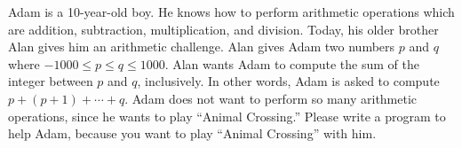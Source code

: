 Adam is a 10-year-old boy.
He knows how to perform arithmetic operations which are addition, 
subtraction, multiplication, and division.
Today, his older brother Alan gives him an arithmetic challenge.
Alan gives Adam two numbers $p$ and $q$ where $-1000\le p\le q\le 1000$.
Alan wants Adam to 
compute the sum of the integer between $p$ and $q$, inclusively.
In other words, Adam is asked to compute $p+(p+1)+\cdots+q$.
Adam does not want to perform so many arithmetic operations, 
since he wants to play ``Animal Crossing.'' 
Please write a program to help Adam, because you want to play 
``Animal Crossing'' with him.
